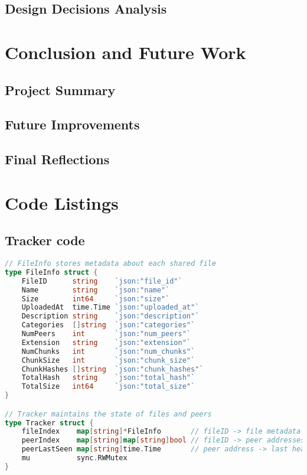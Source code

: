 \documentclass[12pt,a4paper]{report}
\begin{document}
\section{Design Decisions Analysis}

\chapter{Conclusion and Future Work}
\section{Project Summary}

\section{Future Improvements}

\section{Final Reflections}

\appendix
\chapter{Code Listings}

\section{Tracker code}
\begin{lstlisting}[language=Go, caption={TCP transport implementation}, label={lst:tracker-code}]
// FileInfo stores metadata about each shared file
type FileInfo struct {
    FileID      string    `json:"file_id"`
    Name        string    `json:"name"`
    Size        int64     `json:"size"`
    UploadedAt  time.Time `json:"uploaded_at"`
    Description string    `json:"description"`
    Categories  []string  `json:"categories"`
    NumPeers    int       `json:"num_peers"`
    Extension   string    `json:"extension"`
    NumChunks   int       `json:"num_chunks"`
    ChunkSize   int       `json:"chunk_size"`
    ChunkHashes []string  `json:"chunk_hashes"`
    TotalHash   string    `json:"total_hash"`
    TotalSize   int64     `json:"total_size"`
}

// Tracker maintains the state of files and peers
type Tracker struct {
    fileIndex    map[string]*FileInfo       // fileID -> file metadata
    peerIndex    map[string]map[string]bool // fileID -> peer addresses
    peerLastSeen map[string]time.Time       // peer address -> last heartbeat
    mu           sync.RWMutex
}
\end{lstlisting}
\end{document}
